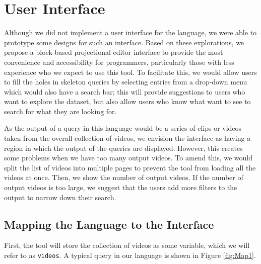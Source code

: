 
\section{User Interface}
Although we did not implement a user interface for the language, we were able to prototype some designs for such an interface. 
Based on these explorations, we propose a block-based projectional editor interface to provide the most convenience and accessibility for programmers, particularly those with less experience who we expect to use this tool. 
To facilitate this, we would allow users to fill the holes in skeleton queries by selecting entries from a drop-down menu which would also have a search bar; this will provide suggestions to users who want to explore the dataset, but also allow users who know what want to see to search for what they are looking for.  

As the output of a query in this language would be a series of clips or videos taken from the overall collection of videos, we envision the interface as having a region in which the output of the queries are displayed.
However, this creates some problems when we have too many output videos.
To amend this, we would split the list of videos into multiple pages to prevent the tool from loading all the videos at once.
Then, we show the number of output videos.
If the number of output videos is too large, we suggest that the users add more filters to the output to narrow down their search.

\subsection{Mapping the Language to the Interface}

First, the tool will store the collection of videos as some variable, which we will refer to as \texttt{videos}.
A typical query in our language is shown in Figure \ref{fig:Map1}.

